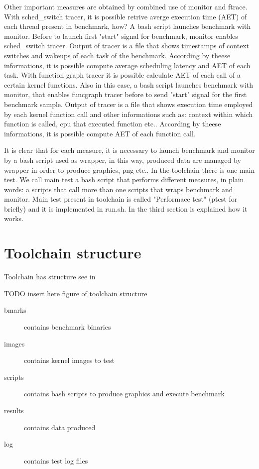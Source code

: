 \documentclass[a4paper,10pt]{article}
\begin{document}
\begin{multicols}{2}
Other important measures are obtained by combined use of monitor and ftrace.
With sched\_switch tracer, it is possible retrive averge execution time (AET) of each
thread present in benchmark, how? A bash script launches benchmark with monitor. 
Before to launch first "start" signal for benchmark, monitor enables sched\_switch tracer. 
Output of tracer is a file that shows timestamps of context switches and 
wakeups of each task of the benchmark. According by theese informations, it is possible 
compute average scheduling latency and AET of each task.
With function graph tracer it is possible calculate AET of each
call of a certain kernel functions. Also in this case, a bash script launches
benchmark with monitor, that enables funcgraph tracer before to send "start" signal
for the first benchmark sample. Output of tracer is a file that shows execution time employed by each
kernel function call and other informations such as: context within which function is called,
cpu that executed function etc..
According by theese informations, it is possible compute AET of each 
function call. 

It is clear that for each measure, it is necessary to launch benchmark and monitor by 
a bash script used as wrapper, in this way, produced data are managed by wrapper in order
to produce graphics, png etc..
In the toolchain there is one main test. We call main test a bash script that 
performs different measures, in plain words: a scripts that call more than one
scripts that wraps benchmark and monitor. Main test present in toolchain 
is called "Performace test" (ptest for briefly)
and it is implemented in run.sh. In the third section is explained how it works. 

\section{Toolchain structure}

Toolchain has structure see in 

TODO insert here figure of toolchain structure

\begin{description}
	\item[bmarks] contains benchmark binaries 
	\item[images] contains kernel images to test
	\item[scripts] contains bash scripts to produce graphics and execute benchmark
	\item[results] contains data produced
	\item[log] contains test log files
\end{description}


\end{multicols}
\end{document}
